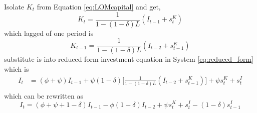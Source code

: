 \documentclass{article}
\begin{document}
Isolate $K_t$ from Equation \ref{eq:LOMcapital} and get,
$$
K_t = \frac{1}{1 - (1 - \delta)L}(I_{t-1} + s_t^K)
$$
which lagged of one period is
$$
K_{t-1} = \frac{1}{1 - (1 - \delta)L}(I_{t-2} + s_{t-1}^K)
$$
substitute is into reduced form investment equation in System \ref{eq:reduced_form} which is
\begin{equation*}
\begin{aligned}
I_t &= ( \phi + \psi) I_{t-1} + \psi (1 - \delta) \bigg[  \frac{1}{1 - (1 - \delta)L}(I_{t-2} + s_{t-1}^K) \bigg] + \psi s_t^K + s_t^I \\
\end{aligned}
\end{equation*}
which can be rewritten as
\begin{equation*}
I_t = ( \phi + \psi + 1 - \delta) I_{t-1} - \phi (1 - \delta) I_{t-2} + \psi s_{t}^K  + s_t^I  - (1 - \delta) s_{t-1}^I
\end{equation*}
\end{document}
